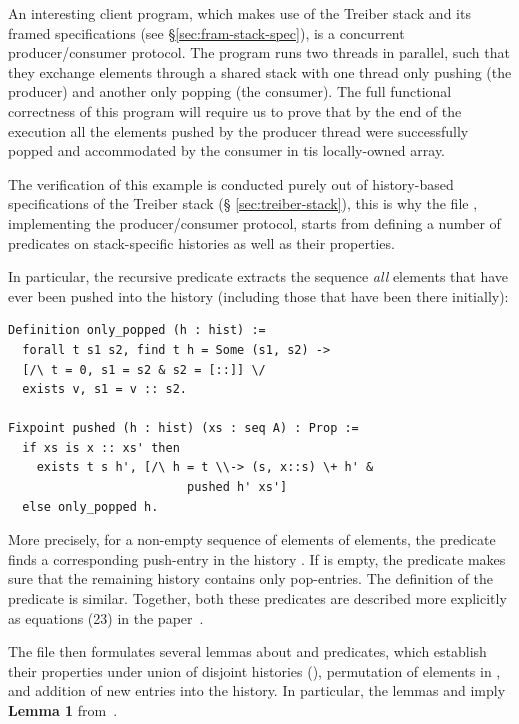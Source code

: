 An interesting client program, which makes use of the Treiber stack
and its framed specifications (see \S\ref{sec:fram-stack-spec}), is a
concurrent producer/consumer protocol. The program runs two threads in
parallel, such that they exchange elements through a shared stack with
one thread only pushing (the producer) and another only popping (the
consumer). The full functional correctness of this program will
require us to prove that by the end of the execution all the elements
pushed by the producer thread were successfully popped and
accommodated by the consumer in tis locally-owned array.

The verification of this example is conducted purely out of
history-based specifications of the Treiber stack (\S
\ref{sec:treiber-stack}), this is why the file ,
implementing the producer/consumer protocol, starts from defining a
number of predicates on stack-specific histories as well as their
properties. 

In particular, the recursive predicate  extracts the
sequence \emph{all} elements  that have ever been pushed into
the history  (including those that have been there initially):

\begin{lstlisting}
Definition only_popped (h : hist) := 
  forall t s1 s2, find t h = Some (s1, s2) -> 
  [/\ t = 0, s1 = s2 & s2 = [::]] \/
  exists v, s1 = v :: s2.

Fixpoint pushed (h : hist) (xs : seq A) : Prop := 
  if xs is x :: xs' then 
    exists t s h', [/\ h = t \\-> (s, x::s) \+ h' &
                         pushed h' xs']
  else only_popped h. 
\end{lstlisting}

More precisely, for a non-empty sequence of elements  of elements, the  predicate finds a corresponding
push-entry in the history . If  is empty, the
predicate makes sure that the remaining history contains only
pop-entries. The definition of the predicate  is
similar. Together, both these predicates are described more explicitly
as equations (23) in the paper~\cite{Sergey-al:ESOP15}.

The file then formulates several lemmas about  and
 predicates, which establish their properties under union
of disjoint histories (), permutation of elements in
, and addition of new entries into the history. In particular,
the lemmas  and  imply
\textbf{Lemma 1} from~\cite{Sergey-al:ESOP15}.

